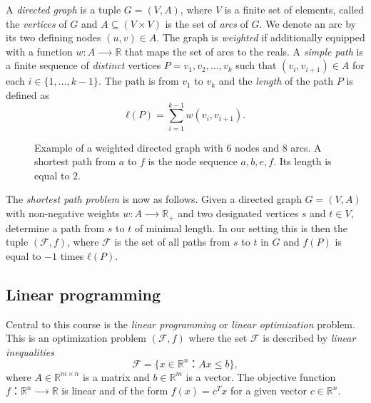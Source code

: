 \begin{example}
  \label{exe:4}
  

  A \emph{directed  graph} is a tuple $G = (V,A)$, where $V$ is a finite set of elements, called the
    \emph{vertices} of $G$ and  $A\subseteq(V\times V)$ is the set of
  \emph{arcs} of $G$. We denote an arc by its two defining nodes $(u,v) \in
  A$. The graph is \emph{weighted} if additionally equipped with a function $w: A ⟶ ℝ$ that maps the set of arcs to the reals. A \emph{simple path} is a finite sequence of \emph{distinct} vertices $P = v_1,v_2,\dots,v_k$  such that $(v_i,v_{i+1}) ∈A$ for each $i ∈ \{1,\dots,k-1\}$. The path is from $v_1$ to $v_k$ and the \emph{length} of the path $P$ is defined as
  \begin{displaymath}
    ℓ(P) = ∑_{i=1}^{k-1 } w(v_i,v_{i+1}). 
  \end{displaymath}


\begin{figure} \centering  
    
  \caption{Example of a weighted directed graph with $6$ nodes and $8$ arcs. A shortest path from $a$ to $f$ is  the node sequence $a,b,e,f$. Its length is equal to $2$.}
\label{fig:11}
\end{figure}

The \emph{shortest path problem} is now as follows. Given a  directed graph $G = (V,A)$  with non-negative weights $w: A ⟶ ℝ_+$  and two designated vertices $s$ and $t ∈V$, determine a path from $s$ to $t$ of minimal length. In our setting this is then the tuple $(ℱ,f)$, where $ℱ$ is the set of all paths from $s$ to $t$ in $G$ and $f(P)$ is equal to $-1$ times $ℓ(P)$. 

\end{example}

\subsection*{Linear programming}

Central to this course is the \emph{linear programming} or \emph{linear optimization} problem.  This is an optimization problem $(ℱ,f)$  where the set $ℱ$ is described by \emph{linear inequalities}
\begin{displaymath}
  ℱ = \{ x ∈ ℝ^n ： Ax ≤ b\}, 
\end{displaymath}
where $A ∈ ℝ^{m ×n}$ is a matrix and $b ∈ ℝ^{m}$ is a vector. The objective function $f： ℝ^n ⟶ℝ$   is linear and of the form $f(x) = c^Tx$ for a given vector $c ∈ ℝ^n$.  


